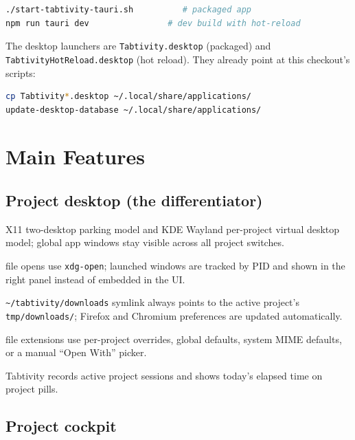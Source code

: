 \documentclass[11pt,a4paper]{article}
\newcommand{\code}[1]{\texttt{#1}}
\begin{document}
\begin{lstlisting}[language=bash]
./start-tabtivity-tauri.sh          # packaged app
npm run tauri dev                # dev build with hot-reload
\end{lstlisting}

The desktop launchers are \code{Tabtivity.desktop} (packaged) and
\code{TabtivityHotReload.desktop} (hot reload). They already point at this
checkout's scripts:

\begin{lstlisting}[language=bash]
cp Tabtivity*.desktop ~/.local/share/applications/
update-desktop-database ~/.local/share/applications/
\end{lstlisting}

\section{Main Features}

\subsection{Project desktop (the differentiator)}

\begin{description}[leftmargin=1.2em,style=nextline]
  \item[Workspace management] X11 two-desktop parking model and KDE Wayland
  per-project virtual desktop model; global app windows stay visible across all
  project switches.
  \item[External window tracking] file opens use \code{xdg-open}; launched
  windows are tracked by PID and shown in the right panel instead of embedded in
  the UI.
  \item[Downloads routing] \code{\textasciitilde/tabtivity/downloads} symlink always
  points to the active project's \code{tmp/downloads/}; Firefox and Chromium
  preferences are updated automatically.
  \item[Default app mapping] file extensions use per-project overrides, global
  defaults, system MIME defaults, or a manual ``Open With'' picker.
  \item[Time tracking] Tabtivity records active project sessions and shows today's
  elapsed time on project pills.
\end{description}

\subsection{Project cockpit}
\end{document}
